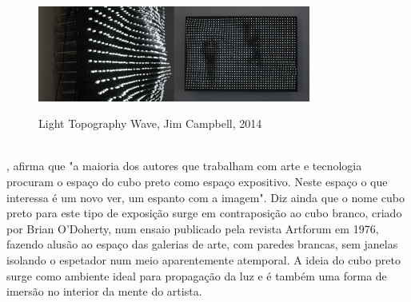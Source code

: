 \begin{figure}[H]
    \centering
    \caption{Light Topography Wave, Jim Campbell, 2014}
	\vspace*{0,2cm}
    \includegraphics[width=0.8\textwidth]{./04-figuras/jim_campbell}
    \label{fig:jim_campbell}
\end{figure}
\vspace*{-0,9cm}
{\raggedright {}}\\

, afirma que "a maioria dos autores que trabalham com arte e tecnologia procuram o espaço do cubo preto como espaço expositivo. Neste espaço o que interessa é um novo ver, um espanto com a imagem". Diz ainda que o nome cubo preto para este tipo de exposição surge em contraposição ao cubo branco, criado por Brian O'Doherty, num ensaio publicado pela revista Artforum em 1976, fazendo alusão ao espaço das galerias de arte, com paredes brancas, sem janelas isolando o espetador num meio aparentemente atemporal. A ideia do cubo preto surge como ambiente ideal para propagação da luz e é também uma forma de imersão no interior da mente do artista.
